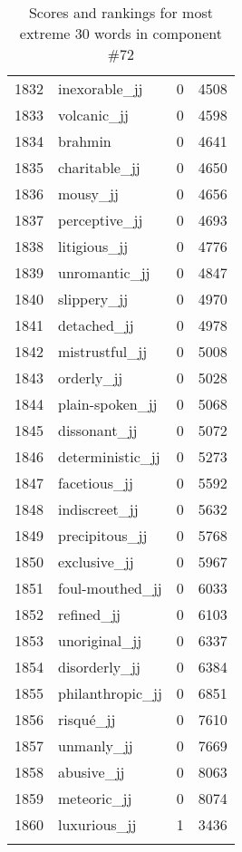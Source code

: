 \begin{longtable}[!htbp]{| rlr@{.}l |}
    1832 & inexorable\_jj & 0 & 4508 \\
    1833 & volcanic\_jj & 0 & 4598 \\
    1834 & brahmin & 0 & 4641 \\
    1835 & charitable\_jj & 0 & 4650 \\
    1836 & mousy\_jj & 0 & 4656 \\
    1837 & perceptive\_jj & 0 & 4693 \\
    1838 & litigious\_jj & 0 & 4776 \\
    1839 & unromantic\_jj & 0 & 4847 \\
    1840 & slippery\_jj & 0 & 4970 \\
    1841 & detached\_jj & 0 & 4978 \\
    1842 & mistrustful\_jj & 0 & 5008 \\
    1843 & orderly\_jj & 0 & 5028 \\
    1844 & plain-spoken\_jj & 0 & 5068 \\
    1845 & dissonant\_jj & 0 & 5072 \\
    1846 & deterministic\_jj & 0 & 5273 \\
    1847 & facetious\_jj & 0 & 5592 \\
    1848 & indiscreet\_jj & 0 & 5632 \\
    1849 & precipitous\_jj & 0 & 5768 \\
    1850 & exclusive\_jj & 0 & 5967 \\
    1851 & foul-mouthed\_jj & 0 & 6033 \\
    1852 & refined\_jj & 0 & 6103 \\
    1853 & unoriginal\_jj & 0 & 6337 \\
    1854 & disorderly\_jj & 0 & 6384 \\
    1855 & philanthropic\_jj & 0 & 6851 \\
    1856 & risqué\_jj & 0 & 7610 \\
    1857 & unmanly\_jj & 0 & 7669 \\
    1858 & abusive\_jj & 0 & 8063 \\
    1859 & meteoric\_jj & 0 & 8074 \\
    1860 & luxurious\_jj & 1 & 3436 \\
    \hline
    \caption{Scores and rankings for most extreme 30 words in component \#72} \\
\end{longtable}
